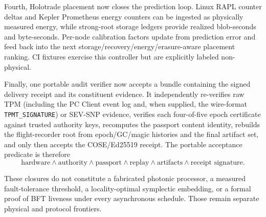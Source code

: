 Fourth, Holotrade placement now closes the prediction loop.  Linux RAPL counter
deltas and Kepler Prometheus energy counters can be ingested as physically
measured energy, while strong-root storage ledgers provide realized blob-seconds
and byte-seconds.  Per-node calibration factors update from prediction error and
feed back into the next storage/recovery/energy/erasure-aware placement ranking.
CI fixtures exercise this controller but are explicitly labeled non-physical.

Finally, one portable audit verifier now accepts a bundle containing the signed
delivery receipt and its constituent evidence.  It independently re-verifies raw
TPM (including the PC Client event log and, when supplied, the wire-format
\texttt{TPMT\_SIGNATURE}) or SEV-SNP evidence, verifies each four-of-five epoch
certificate against trusted authority keys, recomputes the passport content
identity, rebuilds the flight-recorder root from epoch/GC/magic histories and the
final artifact set, and only then accepts the COSE/Ed25519 receipt.  The portable
acceptance predicate is therefore
\[
\boxed{\text{hardware}\land\text{authority}\land\text{passport}\land
\text{replay}\land\text{artifacts}\land\text{receipt signature}}.
\]

These closures do not constitute a fabricated photonic processor, a measured
fault-tolerance threshold, a locality-optimal symplectic embedding, or a formal
proof of BFT liveness under every asynchronous schedule.  Those remain separate
physical and protocol frontiers.
